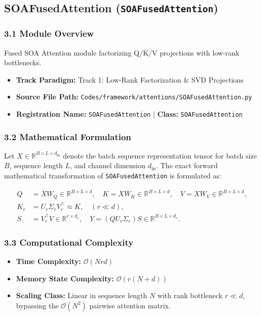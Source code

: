 \subsection{SOAFusedAttention (\texttt{SOAFusedAttention})}
\label{sec:app_module_SOAFusedAttention}

\subsubsection*{3.1 Module Overview}
Fused SOA Attention module factorizing Q/K/V projections with low-rank bottlenecks.
\begin{itemize}
    \item \textbf{Track Paradigm:} Track 1: Low-Rank Factorization & SVD Projections
    \item \textbf{Source File Path:} \texttt{Codes/framework/attentions/SOAFusedAttention.py}
    \item \textbf{Registration Name:} \texttt{SOAFusedAttention} $\mid$ \textbf{Class:} \texttt{SOAFusedAttention}
\end{itemize}

\subsubsection*{3.2 Mathematical Formulation}
Let $X \in \mathbb{R}^{B \times L \times d_{\text{in}}}$ denote the batch sequence representation tensor for batch size $B$, sequence length $L$, and channel dimension $d_{\text{in}}$. The exact forward mathematical transformation of \texttt{SOAFusedAttention} is formulated as:

\begin{align}
Q &= X W_Q \in \mathbb{R}^{B \times L \times d}, \quad K = X W_K \in \mathbb{R}^{B \times L \times d}, \quad V = X W_V \in \mathbb{R}^{B \times L \times d}, \\
K_r &= U_r \Sigma_r V_r^\top \approx K, \quad (r \ll d), \\
S &= V_r^\top V \in \mathbb{R}^{r \times d_v}, \quad Y = (Q U_r \Sigma_r) S \in \mathbb{R}^{B \times L \times d_v}.
\end{align}


\subsubsection*{3.3 Computational Complexity}
\begin{itemize}
    \item \textbf{Time Complexity:} $\mathcal{O}(N r d)$
    \item \textbf{Memory State Complexity:} $\mathcal{O}(r(N + d))$
    \item \textbf{Scaling Class:} Linear in sequence length $N$ with rank bottleneck $r \ll d$, bypassing the $\mathcal{O}(N^2)$ pairwise attention matrix.
\end{itemize}

